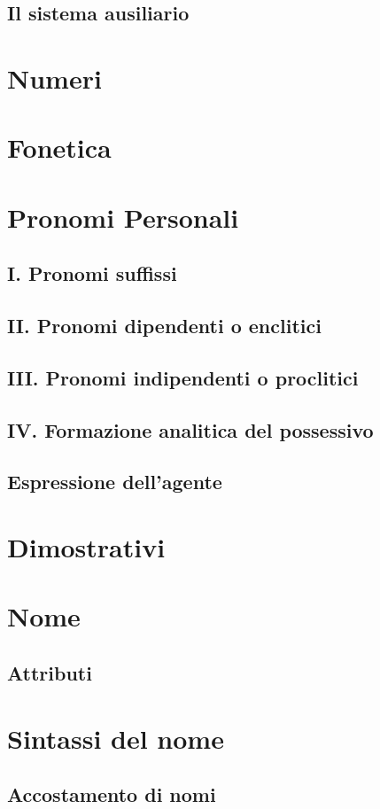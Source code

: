 \documentclass[11pt,a4paper]{amsart}
\begin{document}
\subsection{Il sistema ausiliario}
\section{Numeri}
\section{Fonetica}
\section{Pronomi Personali}
\subsection{I. Pronomi suffissi}
\subsection{II. Pronomi dipendenti o enclitici}
\subsection{III. Pronomi indipendenti o proclitici}
\subsection{IV. Formazione analitica del possessivo}
\subsection{Espressione dell'agente}
\section{Dimostrativi}
\section{Nome}
\subsection{Attributi}
\section{Sintassi del nome}
\subsection{Accostamento di nomi}
\end{document}
